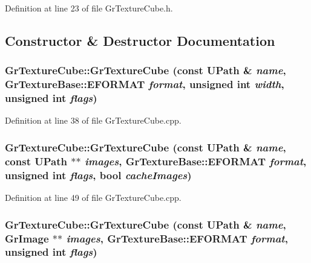 \begin{CompactItemize}
Definition at line 23 of file GrTextureCube.h.

\subsection{Constructor \& Destructor Documentation}
\hypertarget{class_gr_texture_cube_8668abef3149469fe1680350e56d194a}{
\subsubsection[{GrTextureCube}]{\setlength{\rightskip}{0pt plus 5cm}GrTextureCube::GrTextureCube (const {\bf UPath} \& {\em name}, \/  {\bf GrTextureBase::EFORMAT} {\em format}, \/  unsigned int {\em width}, \/  unsigned int {\em flags})}}
\label{class_gr_texture_cube_8668abef3149469fe1680350e56d194a}




Definition at line 38 of file GrTextureCube.cpp.\hypertarget{class_gr_texture_cube_d703eec85745ee86d33cc30c54e99496}{
\subsubsection[{GrTextureCube}]{\setlength{\rightskip}{0pt plus 5cm}GrTextureCube::GrTextureCube (const {\bf UPath} \& {\em name}, \/  const {\bf UPath} $\ast$$\ast$ {\em images}, \/  {\bf GrTextureBase::EFORMAT} {\em format}, \/  unsigned int {\em flags}, \/  bool {\em cacheImages})}}
\label{class_gr_texture_cube_d703eec85745ee86d33cc30c54e99496}




Definition at line 49 of file GrTextureCube.cpp.\hypertarget{class_gr_texture_cube_6721b847573cbeb2ad4ec7fc9d358329}{
\subsubsection[{GrTextureCube}]{\setlength{\rightskip}{0pt plus 5cm}GrTextureCube::GrTextureCube (const {\bf UPath} \& {\em name}, \/  {\bf GrImage} $\ast$$\ast$ {\em images}, \/  {\bf GrTextureBase::EFORMAT} {\em format}, \/  unsigned int {\em flags})}}
\label{class_gr_texture_cube_6721b847573cbeb2ad4ec7fc9d358329}





\end{CompactItemize}
